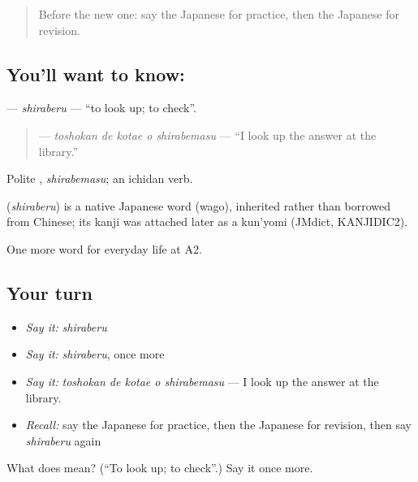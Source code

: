 \begin{quote}
Before the new one: say the Japanese for practice, then the Japanese for revision.
\end{quote}

\subsection*{You'll want to know: }
\textbf{} — \emph{shiraberu} — \textquotedblleft{}to look up; to check\textquotedblright{}.

\begin{quote}
\textbf{  } — \emph{toshokan de kotae o shirabemasu} — \textquotedblleft{}I look up the answer at the library.\textquotedblright{}
\end{quote}

Polite \textbf{}, \emph{shirabemasu}; an ichidan verb.

\begin{cousinweb}
\textbf{} (\emph{shiraberu}) is a native Japanese word (wago), inherited rather than borrowed from Chinese; its kanji was attached later as a kun'yomi (JMdict, KANJIDIC2).
\end{cousinweb}

\begin{grammarlens}[title={What you've built}]
One more word for everyday life at A2.
\end{grammarlens}

\subsection*{Your turn}
\begin{itemize}
\raggedright
  \item \emph{Say it:} \emph{shiraberu}
  \item \emph{Say it:} \emph{shiraberu}, once more
  \item \emph{Say it:} \emph{toshokan de kotae o shirabemasu} — I look up the answer at the library.
  \item \emph{Recall:} say the Japanese for practice, then the Japanese for revision, then say \emph{shiraberu} again
\end{itemize}

\begin{tcolorbox}[breakable,colback=teal!4,colframe=teal!35!black,title={Before you move on}]
What does  mean? (\textquotedblleft{}To look up; to check\textquotedblright{}.) Say it once more.
\end{tcolorbox}
